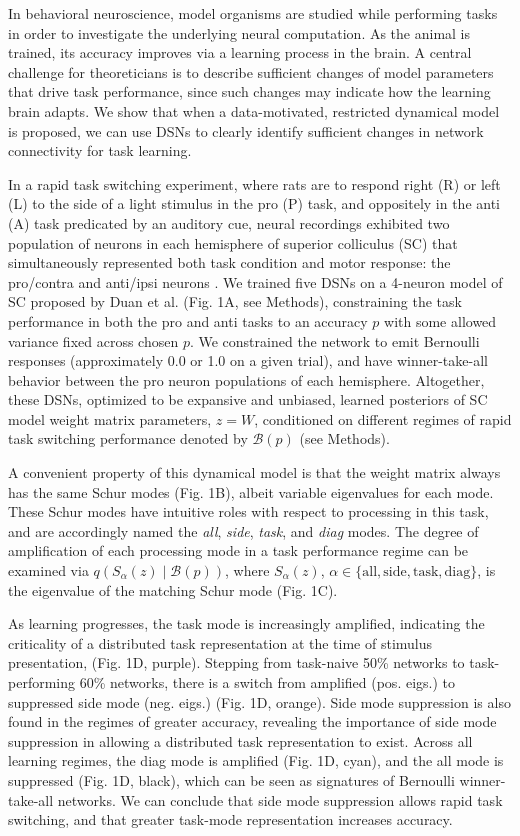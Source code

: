 
In behavioral neuroscience, model organisms are studied while performing tasks in order to investigate the underlying neural computation.  As the animal is trained, its accuracy improves via a learning process in the brain. A central challenge for theoreticians is to describe sufficient changes of model parameters that drive task performance, since such changes may indicate how the learning brain adapts.   We show that when a data-motivated, restricted dynamical model is proposed, we can use DSNs to clearly identify sufficient changes in network connectivity for task learning.

In a rapid task switching experiment, where rats are to respond right (R) or left (L) to the side of a light stimulus in the pro (P) task, and oppositely in the anti (A) task predicated by an auditory cue, neural recordings exhibited two population of neurons in each hemisphere of superior colliculus (SC) that simultaneously represented both task condition and motor response: the pro/contra and anti/ipsi neurons \cite{duan2018collicular}. We trained five DSNs on a 4-neuron model of SC proposed by Duan et al. (Fig. 1A, see Methods),  constraining the task performance in both the pro and anti tasks to an accuracy $p$ with some allowed variance fixed across chosen $p$.  We constrained the network to emit Bernoulli responses (approximately 0.0 or 1.0 on a given trial), and have winner-take-all behavior between the pro neuron populations of each hemisphere. Altogether, these DSNs, optimized to be expansive and unbiased, learned posteriors of SC model weight matrix parameters, $z = W$, conditioned on different regimes of rapid task switching performance denoted by $\mathcal{B}(p)$ (see Methods).

A convenient property of this dynamical model is that the weight matrix always has the same Schur modes (Fig. 1B), albeit variable eigenvalues for each mode.  These Schur modes have intuitive roles with respect to processing in this task, and are accordingly named the \textit{all}, \textit{side}, \textit{task}, and \textit{diag} modes.  The degree of amplification of each processing mode in a task performance regime can be examined via $q(S_\alpha(z) \mid \mathcal{B}(p))$, where $S_\alpha(z)$, $\alpha \in \{\text{all}, \text{side}, \text{task}, \text{diag} \}$, is the eigenvalue of the matching Schur mode (Fig. 1C).  

As learning progresses, the task mode is increasingly amplified, indicating the criticality of a distributed task representation at the time of stimulus presentation, (Fig. 1D, purple).  Stepping from task-naive 50\% networks to task-performing 60\% networks, there is a switch from amplified (pos. eigs.) to suppressed side mode (neg. eigs.) (Fig. 1D, orange).  Side mode suppression is also found in the regimes of greater accuracy, revealing the importance of side mode suppression in allowing a distributed task representation to exist.   Across all learning regimes, the diag mode is amplified (Fig. 1D, cyan), and the all mode is suppressed (Fig. 1D, black), which can be seen as signatures of Bernoulli winner-take-all networks.  We can conclude that side mode suppression allows rapid task switching, and that greater task-mode representation increases accuracy.
